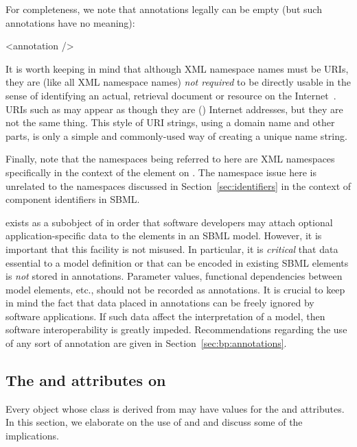 For completeness, we note that annotations legally can be
empty (but such annotations have no meaning):

\begin{example}
<annotation />
\end{example}

It is worth keeping in mind that although XML namespace names must
be URIs, they are (like all XML namespace names) \emph{not
  required} to be directly usable in the sense of identifying an
actual, retrieval document or resource on the
Internet~\citep{bray:1999}.  URIs such as
 may appear as though they are (\eg)
Internet addresses, but they are not the same thing.  This style
of URI strings, using a domain name and other parts, is only a
simple and commonly-used way of creating a unique name string.

Finally, note that the namespaces being referred to here are XML
namespaces specifically in the context of the 
element on \SBase.  The namespace issue here is unrelated to the
namespaces discussed in Section~\ref{sec:identifiers} in the
context of component identifiers in SBML.



\Annotation exists as a subobject of \SBase in
order that software developers may attach optional
application-specific data to the elements in an SBML model.
However, it is important that this facility is not misused.  In
particular, it is \emph{critical} that data essential to a model
definition or that can be encoded in existing SBML elements is
\emph{not} stored in annotations.  Parameter values,
functional dependencies between model elements, etc., should not
be recorded as annotations.  It is crucial to keep in mind the
fact that data placed in annotations can be freely ignored by
software applications.  If such data affect the interpretation of
a model, then software interoperability is greatly impeded.  
Recommendations regarding the use of any sort of annotation are
given in Section~\ref{sec:bp:annotations}.  


\begin{blockChanged}

\subsection{The  and  attributes on \SBase}
\label{sec:idnameattribs}

Every object whose class is derived from \SBase may have values for the  and  attributes.  In this section, we elaborate on the use of  and  and discuss some of the implications.

\end{blockChanged}


